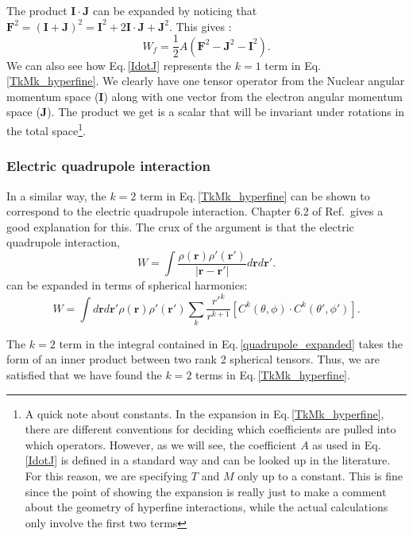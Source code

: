 The product $\mathbf{I}\cdot\mathbf{J}$ can be expanded by noticing that $\mathbf{F}^2=(\mathbf{I}+\mathbf{J})^2=\mathbf{I}^2+2 \mathbf{I}\cdot\mathbf{J}+\mathbf{J}^2$. This gives \cite{cuaMITnotes}\cite{sobelman_spectra}: 
\begin{equation}\label{Wf_dot_product}
W_f=\frac{1}{2}A(\mathbf{F}^2-\mathbf{J}^2-\mathbf{I}^2).
\end{equation}
We can also see how Eq.\,\ref{IdotJ} represents the $k=1$ term in Eq.\,\eqref{TkMk_hyperfine}. We clearly have one tensor operator from the Nuclear angular momentum space ($\mathbf{I}$) along with one vector from the electron angular momentum space ($\mathbf{J}$). The product we get is a scalar that will be invariant under rotations in the total space\footnote{A quick note about constants. In the expansion in Eq.\,\eqref{TkMk_hyperfine}, there are different conventions \cite{schwartz_hyperfine_expansion} for deciding which coefficients are pulled into which operators. However, as we will see, the coefficient $A$ as used in Eq.\,\ref{IdotJ} is defined in a standard way and can be looked up in the literature. For this reason, we are specifying $T$ and $M$ only up to a constant. This is fine since the point of showing the expansion is really just to make a comment about the geometry of hyperfine interactions, while the actual calculations only involve the first two terms}.

\subsubsection{Electric quadrupole interaction}
In a similar way, the $k=2$ term in Eq.\,\eqref{TkMk_hyperfine} can be shown to correspond to the electric quadrupole interaction. Chapter 6.2 of Ref.\,\cite{sobelman_spectra} gives a good explanation for this. The crux of the argument is that the electric quadrupole interaction,
\begin{equation}
W=\int\frac{\rho(\mathbf{r})\rho'(\mathbf{r}')}{|\mathbf{r}-\mathbf{r}'|}d\mathbf{r}d\mathbf{r'}.
\end{equation}
can  be expanded in terms of spherical harmonics: 
\begin{equation}
W=\int d\mathbf{r}d\mathbf{r'}
\rho(\mathbf{r})\rho'(\mathbf{r}')\sum_k \frac{r'^k}{r^{k+1}}[C^k(\theta,\phi)\cdot C^k(\theta',\phi')] \label{quadrupole_expanded}.
\end{equation}

The $k=2$ term in the integral contained in Eq.\,\ref{quadrupole_expanded} takes the form of an inner product between two rank 2 spherical tensors. Thus, we are satisfied that we have found the $k=2$ terms in Eq.\,\eqref{TkMk_hyperfine}.

